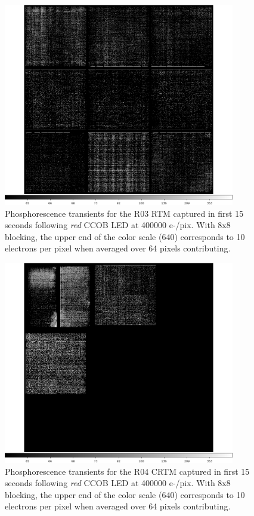 \begin{figure}[htbp]
\centering
\includegraphics[width=0.9\textwidth]{sections/figures/phosphorescence-survey/itl_fluor_R03_0-19_rb1_log.png}
\caption{Phosphorescence transients for the R03 RTM captured in first 15 seconds following {\it red} CCOB LED at 400000 e-/pix. With 8x8 blocking, the upper end of the color scale (640) corresponds to 10 electrons per pixel when averaged over 64 pixels contributing.}
\label{fig:phos:R03}
\end{figure}

\begin{figure}[htbp]
\centering
\includegraphics[width=0.9\textwidth]{sections/figures/phosphorescence-survey/itl_fluor_R04_0-19_rb1_log.png}
\caption{Phosphorescence transients for the R04 CRTM captured in first 15 seconds following {\it red} CCOB LED at 400000 e-/pix. With 8x8 blocking, the upper end of the color scale (640) corresponds to 10 electrons per pixel when averaged over 64 pixels contributing.}
\label{fig:phos:R04}
\end{figure}

